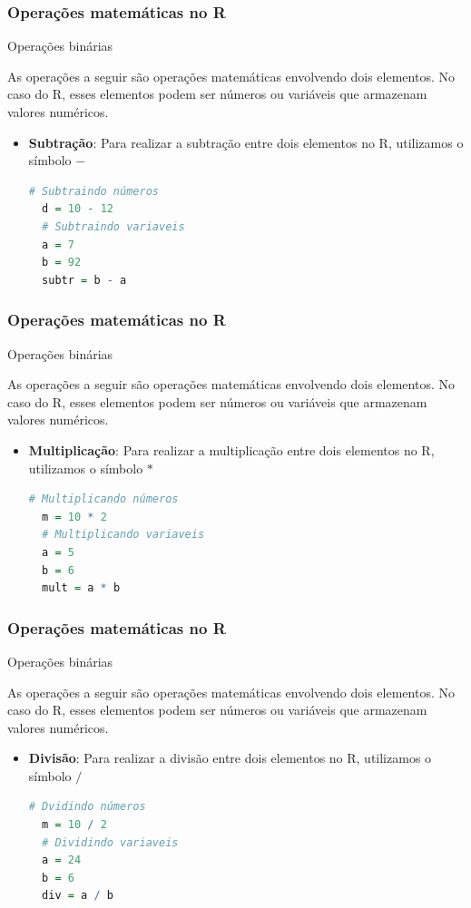 \documentclass{beamer}
\begin{document}
\begin{frame}[fragile]
  \frametitle{Operações matemáticas no R} 
  {\color{gray}\large Operações binárias}

  As operações a seguir são operações matemáticas envolvendo dois elementos. No caso do R, esses elementos podem ser números ou variáveis que armazenam valores
  numéricos.
    \begin{itemize}
    \item \textbf{Subtração}: Para realizar a subtração entre dois elementos no R, utilizamos o símbolo $-$
    \begin{lstlisting}[language=R]
  # Subtraindo números
  d = 10 - 12
  # Subtraindo variaveis
  a = 7
  b = 92
  subtr = b - a
  \end{lstlisting}
  \end{itemize}
\end{frame}

\begin{frame}[fragile]
  \frametitle{Operações matemáticas no R} 
  {\color{gray}\large Operações binárias}

  As operações a seguir são operações matemáticas envolvendo dois elementos. No caso do R, esses elementos podem ser números ou variáveis que armazenam valores
  numéricos.
    \begin{itemize}
    \item \textbf{Multiplicação}: Para realizar a multiplicação entre dois elementos no R, utilizamos o símbolo $*$
    \begin{lstlisting}[language=R]
  # Multiplicando números
  m = 10 * 2
  # Multiplicando variaveis
  a = 5
  b = 6
  mult = a * b
  \end{lstlisting}
  \end{itemize}
\end{frame}

\begin{frame}[fragile]
  \frametitle{Operações matemáticas no R} 
  {\color{gray}\large Operações binárias}

  As operações a seguir são operações matemáticas envolvendo dois elementos. No caso do R, esses elementos podem ser números ou variáveis que armazenam valores
  numéricos. 
    \begin{itemize}
    \item \textbf{Divisão}: Para realizar a divisão entre dois elementos no R, utilizamos o símbolo $/$
    \begin{lstlisting}[language=R]
  # Dvidindo números
  m = 10 / 2
  # Dividindo variaveis
  a = 24
  b = 6
  div = a / b
  \end{lstlisting}
  \end{itemize}
\end{frame}
\end{document}
